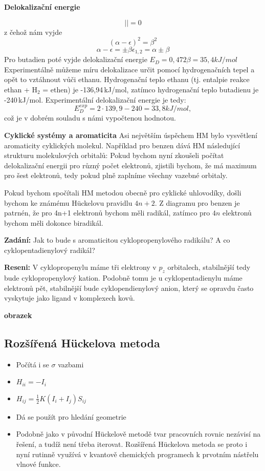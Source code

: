 \textbf{Delokalizační energie}

$$
\left| \right|=0
$$
z čehož nám vyjde
$$
(\alpha-\epsilon)^2=\beta^2
$$
$$
\alpha - \epsilon = \pm \beta
\epsilon_{1,2}= \alpha\pm \beta
$$
Pro butadien poté vyjde delokalizační energie $E_D=0,472\beta=35,4 kJ/mol$
Experimentálně můžeme míru delokalizace určit pomocí hydrogenačních tepel a opět to vztáhnout vůči ethanu.
Hydrogenační teplo ethanu (tj. entalpie reakce ethan + H$_2$ = ethen) je -136,94\,kJ/mol, zatímco hydrogenační teplo butadienu je -240\,kJ/mol. Experimentální delokalizační energie je tedy:
$$
E_D^{exp}=2\cdot139,9-240 = 33,8 kJ/mol,
$$
což je v dobrém souladu s námi vypočtenou hodnotou.

\textbf{Cyklické systémy a aromaticita}
Asi největším úspěchem HM bylo vysvětlení aromaticity cyklických molekul.
Například pro benzen dává HM následující strukturu molekulových orbitalů:
Pokud bychom nyní zkoušeli počítat delokalizační energii pro různý počet elektronů, zjistili bychom, že má maximum pro šest elektronů, tedy pokud plně zaplníme všechny vazebné orbitaly.

Pokud bychom spočítali HM metodou obecně pro cyklické uhlovodíky, došli bychom ke známému H\"{u}ckelovu pravidlu $4n+2$. Z diagramu pro benzen je patrnén, že pro 4n+1 elektronů bychom měli radikál, zatímco pro $4n$ elektronů bychom měli dokonce biradikál.

\begin{priklad}
\textbf{Zadání:} Jak to bude s aromaticitou cyklopropenylového radikálu? A co cyklopentadienylový radikál?

\textbf{Reseni:} V cyklopropenylu máme tři elektrony v $p_z$ orbitalech, stabilnější tedy bude cyklopropenylový kation. Podobně tomu je u cyklopentadienylu máme elektronů pět, stabilnější bude cyklopendienylový anion, který se opravdu často vyskytuje jako ligand v komplexech kovů.
\end{priklad}

\textbf{obrazek}
\bigskip

\subsection{Rozšířená H\"{u}ckelova metoda}

\begin{itemize}
\item Počítá i se $\sigma$ vazbami
\item $H_{ii}=-I_i$
\item $H_{ij}=\frac{1}{2}K(I_i+I_j)S_{ij}$
\item Dá se použít pro hledání geometrie
\item Podobně jako v původní H\"{u}ckelově metodě tvar pracovních rovnic nezávisí na řešení, a tudíž není třeba iterovat. Rozšířená H\"{u}ckelova metoda se proto i nyní rutinně využívá v kvantově chemických programech k prvotním nástřelu vlnové funkce.
\end{itemize}


